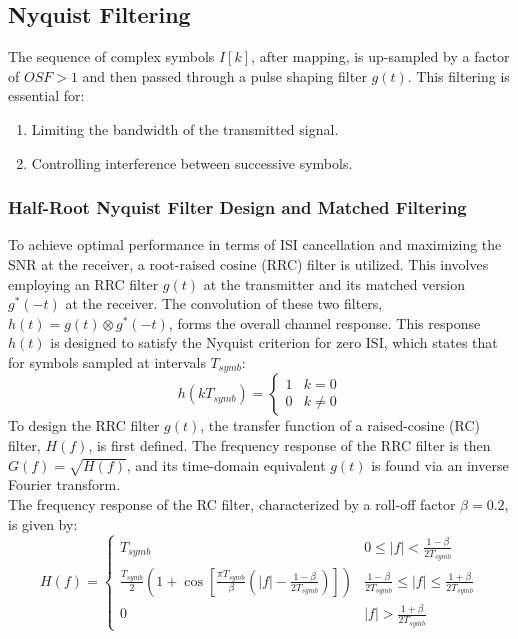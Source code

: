 \subsection{Nyquist Filtering}
The sequence of complex symbols $I[k]$, after mapping, is up-sampled by a factor of $OSF > 1$ and then passed through a pulse shaping filter $g(t)$. This filtering is essential for:
\begin{enumerate}
	\item Limiting the bandwidth of the transmitted signal.
	\item Controlling interference between successive symbols.
\end{enumerate}

\subsubsection{Half-Root Nyquist Filter Design and Matched Filtering}
To achieve optimal performance in terms of ISI cancellation and maximizing the SNR at the receiver, a root-raised cosine (RRC) filter is utilized. This involves employing an RRC filter $g(t)$ at the transmitter and its matched version $g^*(-t)$ at the receiver. The convolution of these two filters, $h(t) = g(t) \otimes g^*(-t)$, forms the overall channel response. This response $h(t)$ is designed to satisfy the Nyquist criterion for zero ISI, which states that for symbols sampled at intervals $T_{symb}$:
\begin{equation}
	h(kT_{symb}) = \begin{cases}
		1 & k=0 \\
		0 & k \neq 0
	\end{cases}
\end{equation}
To design the RRC filter $g(t)$, the transfer function of a raised-cosine (RC) filter, $H(f)$, is first defined. The frequency response of the RRC filter is then $G(f) = \sqrt{H(f)}$, and its time-domain equivalent $g(t)$ is found via an inverse Fourier transform.\\
The frequency response of the RC filter, characterized by a roll-off factor $\beta = 0.2$, is given by:
\begin{equation}
	H(f) = \begin{cases}
		T_{symb} & 0 \le |f| < \frac{1-\beta}{2T_{symb}} \\ %
		\frac{T_{symb}}{2} \left(1 + \cos\left[\frac{\pi T_{symb}}{\beta}\left(|f| - \frac{1-\beta}{2T_{symb}}\right)\right]\right) & \frac{1-\beta}{2T_{symb}} \le |f| \le \frac{1+\beta}{2T_{symb}} \\ %
		0 & |f| > \frac{1+\beta}{2T_{symb}} %
	\end{cases}
\end{equation}

